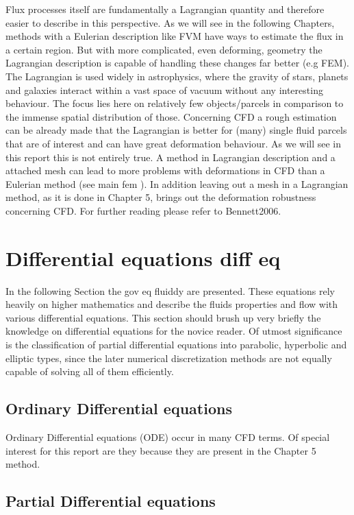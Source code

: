 Flux processes itself are fundamentally a Lagrangian quantity and therefore easier to describe in this perspective. As we will see in the following Chapters, methods with a Eulerian description like FVM have ways to estimate the flux in a certain region. But with more complicated, even deforming, geometry the Lagrangian description is capable of handling these changes far better (e.g FEM). The Lagrangian is used widely in astrophysics, where the gravity of stars, planets and galaxies interact within a vast space of vacuum without any interesting behaviour. The focus lies here on relatively few objects/parcels in comparison to the immense
spatial distribution of those. Concerning CFD a rough estimation can be already made that the Lagrangian is better for (many) single fluid parcels that are of interest and can have great deformation behaviour. As we will see in this report this is not entirely true. A method in Lagrangian description and a attached mesh can lead to more problems with deformations in CFD than a Eulerian method (see main fem ). In addition
leaving out a mesh in a Lagrangian method, as it is done in Chapter 5, brings out the deformation robustness concerning CFD. For further reading please refer to Bennett2006.

\section{Differential equations diff eq}
In the following Section the gov eq fluiddy are presented. These equations rely heavily on
higher mathematics and describe the fluids properties and flow with various differential equations. This section should brush up very briefly the knowledge on differential equations for the novice reader. Of utmost significance is the classification of partial differential equations into parabolic, hyperbolic and elliptic types, since the later numerical discretization methods are not equally capable of solving all of them efficiently.
\subsection{Ordinary Differential equations}
Ordinary Differential equations (ODE) occur in many CFD terms. Of special interest for this report are they because they are present in the Chapter 5 method.

\subsection{Partial Differential equations}

